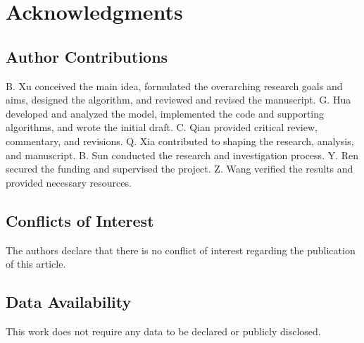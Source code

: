 \documentclass{article}
\begin{document}
\section*{Acknowledgments}

\subsection*{Author Contributions} 

B. Xu conceived the main idea, formulated the overarching research goals and aims, designed the algorithm, and reviewed and revised the manuscript.
G. Hua developed and analyzed the model, implemented the code and supporting algorithms, and wrote the initial draft.
C. Qian provided critical review, commentary, and revisions.
Q. Xia contributed to shaping the research, analysis, and manuscript.
B. Sun conducted the research and investigation process.
Y. Ren secured the funding and supervised the project.
Z. Wang verified the results and provided necessary resources.

% 

\subsection*{Conflicts of Interest}

The authors declare that there is no conflict of interest regarding the publication of this article.

\subsection*{Data Availability}

This work does not require any data to be declared or publicly disclosed.



\end{document}
